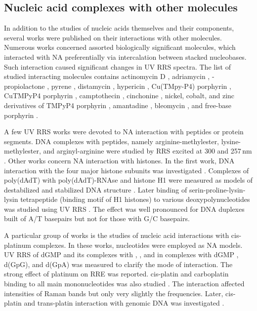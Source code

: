 \subsection{Nucleic acid complexes with other molecules}

In addition to the studies of nucleic acids themselves and their components,
several works were published on their interactions with other molecules.
Numerous works concerned assorted biologically significant molecules, which
interacted with NA preferentially via intercalation between stacked
nucleobases.
Such interaction caused significant changes in UV RRS spectra.
The list of studied interacting molecules contains actinomycin D
\parencite{Chinsky1978},
adriamycin
\parencite{Manfait1982},
-propiolactone
\parencite{Jolles1988},
pyrene
\parencite{Jones1988},
distamycin
\parencite{Grygon1989},
hypericin
\parencite{Miskovsky1995},
Cu(TMpy-P4) porphyrin
\parencite{Tomkova1995},
CuTMPyP4 porphyrin
\parencite{Wheeler1995},
camptothecin
\parencite{Feofanov1996},
cinchonine
\parencite{Weselucha-Birczynska1996},
nickel, cobalt, and zinc derivatives of TMPyP4 porphyrin
\parencite{Wheeler1997},
amantadine
\parencite{Stanicova1999},
bleomycin
\parencite{Weselucha-Birczynska2000},
and free-base  porphyrin
\parencite{Wei2006}.

A few UV RRS works were devoted to NA interaction with peptides or protein
segments.
DNA complexes with peptides, namely arginine-methylester, lysine-methylester,
and arginyl-arginine were studied by RRS excited at 300 and 257\,nm
\parencite{Laigle1982a}.
Other works concern NA interaction with histones.
In the first work, DNA interaction with the four major histone subunits was
investigated
\parencite{Laigle1982b}.
Complexes of poly(dAdT) with poly(dAdT)-RNAse and histone H1 were measured
as models of destabilized and stabilized DNA structure
\parencite{Chinsky1982a}.
Later binding of serin-proline-lysin-lysin tetrapeptide (binding motif of H1
histones) to various deoxypolynucleotides was studied using UV RRS
\parencite{Takeuchi1995}.
The effect was well pronounced for DNA duplexes built of A/T basepairs but not
for those with G/C basepairs.

A particular group of works is the studies of nucleic acid interactions with
cis-platinum complexes.
In these works, nucleotides were employed as NA models.
UV RRS of dGMP and its complexes with , , and
 in complexes with dGMP
\parencite{Perno1987},
d(GpG), and d(GpA)
\parencite{Perno1988}
was measured to clarify the mode of interaction.
The strong effect of platinum on RRE was reported.
cis-platin and carboplatin binding to all main mononucleotides was also studied
\parencite{%
	Benson1992,%
	Benson1993%
}.
The interaction affected intensities of Raman bands but only very slightly the
frequencies.
Later, cis-platin and trans-platin interaction with genomic DNA was
investigated
\parencite{Geng2017}.
